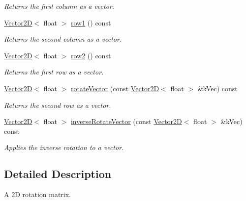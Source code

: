 \begin{DoxyCompactItemize}
\begin{DoxyCompactList}\small\item\em Returns the first column as a vector. \end{DoxyCompactList}\item 
\hypertarget{class_rotation_matrix_ae1facb90c5f863cf19706211d7ea8ac9}{\hyperlink{class_vector2_d}{Vector2\+D}$<$ float $>$ \hyperlink{class_rotation_matrix_ae1facb90c5f863cf19706211d7ea8ac9}{row1} () const }\label{class_rotation_matrix_ae1facb90c5f863cf19706211d7ea8ac9}

\begin{DoxyCompactList}\small\item\em Returns the second column as a vector. \end{DoxyCompactList}\item 
\hypertarget{class_rotation_matrix_a81a16a06bfff94802cec97d6ff93c8e4}{\hyperlink{class_vector2_d}{Vector2\+D}$<$ float $>$ \hyperlink{class_rotation_matrix_a81a16a06bfff94802cec97d6ff93c8e4}{row2} () const }\label{class_rotation_matrix_a81a16a06bfff94802cec97d6ff93c8e4}

\begin{DoxyCompactList}\small\item\em Returns the first row as a vector. \end{DoxyCompactList}\item 
\hyperlink{class_vector2_d}{Vector2\+D}$<$ float $>$ \hyperlink{class_rotation_matrix_acf4a933168e87c20a622da9ddddc2022}{rotate\+Vector} (const \hyperlink{class_vector2_d}{Vector2\+D}$<$ float $>$ \&k\+Vec) const 
\begin{DoxyCompactList}\small\item\em Returns the second row as a vector. \end{DoxyCompactList}\item 
\hyperlink{class_vector2_d}{Vector2\+D}$<$ float $>$ \hyperlink{class_rotation_matrix_ad4a0fc37c2a155029bbb5f958ac0e1f7}{inverse\+Rotate\+Vector} (const \hyperlink{class_vector2_d}{Vector2\+D}$<$ float $>$ \&k\+Vec) const 
\begin{DoxyCompactList}\small\item\em Applies the inverse rotation to a vector. \end{DoxyCompactList}\end{DoxyCompactItemize}


\subsection{Detailed Description}
A 2\+D rotation matrix. 

